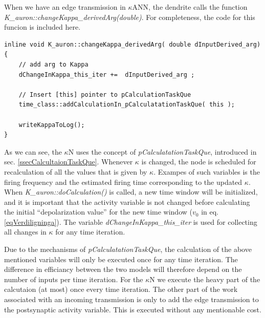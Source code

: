 		When we have an edge transmission in $\kappa$ANN, the dendrite calls the function \emph{K\_auron::changeKappa\_derivedArg(double)}. 
		For completeness, the code for this funcion is included here.
\begin{lstlisting}
inline void K_auron::changeKappa_derivedArg( double dInputDerived_arg)
{
	// add arg to Kappa
	dChangeInKappa_this_iter +=  dInputDerived_arg ;

	// Insert [this] pointer to pCalculationTaskQue
	time_class::addCalculationIn_pCalculatationTaskQue( this );

	writeKappaToLog();
}
\end{lstlisting}

		As we can see, the $\kappa$N uses the concept of \emph{pCalculatationTaskQue}, introduced in sec. \ref{ssecCalcultaionTaskQue}.
		Whenever $\kappa$ is changed, the node is scheduled for recalculation of all the values that is given by $\kappa$. %
		Exampes of such variables is the firing frequency and the estimated firing time corresponding to the updated $\kappa$.
		When \emph{K\_auron::doCalculation()} is called, a new time window will be initialized, and	it is important that the activity variable is not changed before calculating the initial ``depolarization value'' for the new time window
			($v_0$ in eq. \ref{eqVerdiligninga}).
		The variable \emph{dChangeInKappa\_this\_iter} is used for collecting all changes in $\kappa$ for any time iteration.

		Due to the mechanisms of \emph{pCalculatationTaskQue}, the calculation of the above mentioned variables will only be executed once for any time iteration.
		The difference in efficiancy between the two models will therefore depend on the number of inputs per time iteration.
		For the $\kappa$N we execute the heavy part of the calcutaion (at most) once every time iteration. 
		The other part of the work associated with an incoming transmission is only to add the edge transmission to the postsynaptic activity variable. 
		This is executed without any mentionable cost.

